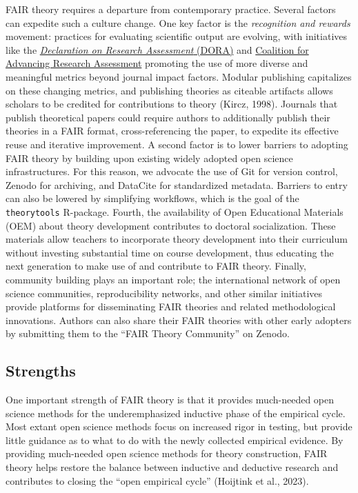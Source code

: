\documentclass[
  man, noextraspace,floatsintext]{apa7}
\begin{document}
FAIR theory requires a departure from contemporary practice.
Several factors can expedite such a culture change.
One key factor is the \emph{recognition and rewards} movement:
practices for evaluating scientific output are evolving, with initiatives like the \href{https://sfdora.org/read/}{\emph{Declaration on Research Assessment} (DORA)} and \href{https://coara.eu/}{Coalition for Advancing Research Assessment}
promoting the use of more diverse and meaningful metrics beyond journal impact factors.
Modular publishing capitalizes on these changing metrics,
and publishing theories as citeable artifacts allows scholars to be credited for contributions to theory (Kircz, 1998).
Journals that publish theoretical papers could require authors to additionally publish their theories in a FAIR format, cross-referencing the paper,
to expedite its effective reuse and iterative improvement.
A second factor is to lower barriers to adopting FAIR theory by building upon existing widely adopted open science infrastructures.
For this reason, we advocate the use of Git for version control, Zenodo for archiving, and DataCite for standardized metadata.
Barriers to entry can also be lowered by simplifying workflows, which is the goal of the \texttt{theorytools} R-package.
Fourth, the availability of Open Educational Materials (OEM) about theory development contributes to doctoral socialization.
These materials allow teachers to incorporate theory development into their curriculum without investing substantial time on course development,
thus educating the next generation to make use of and contribute to FAIR theory.
Finally, community building plays an important role;
the international network of open science communities, reproducibility networks, and other similar initiatives provide platforms for disseminating FAIR theories and related methodological innovations.
Authors can also share their FAIR theories with other early adopters by submitting them to the ``FAIR Theory Community'' on Zenodo.

\subsection{Strengths}\label{strengths}

One important strength of FAIR theory is that it provides much-needed open science methods for the underemphasized inductive phase of the empirical cycle.
Most extant open science methods focus on increased rigor in testing, but provide little guidance as to what to do with the newly collected empirical evidence.
By providing much-needed open science methods for theory construction,
FAIR theory helps restore the balance between inductive and deductive research and contributes to closing the ``open empirical cycle'' (Hoijtink et al., 2023).
\end{document}
